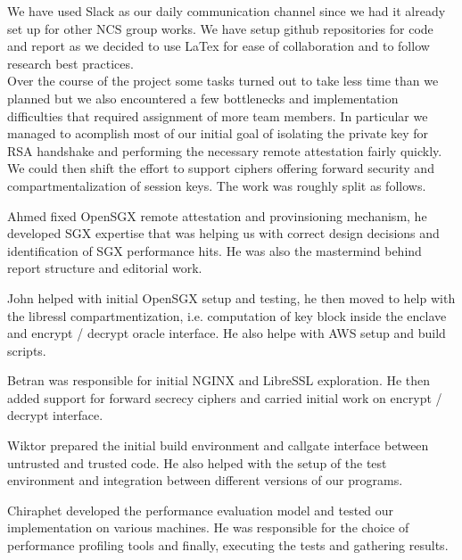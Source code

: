 \documentclass[../main.tex]{subfiles}
\begin{document}
We have used Slack as our daily communication channel since we had it already
set up for other NCS group works. We have setup github repositories for code
and report as we decided to use LaTex for ease of collaboration and to follow
research best practices.\\

Over the course of the project some tasks turned out to take less time than we
planned but we also encountered a few bottlenecks and implementation
difficulties that required assignment of more team members. In particular we
managed to acomplish most of our initial goal of isolating the private key for
RSA handshake and performing the necessary remote attestation fairly quickly.
We could then shift the effort to support ciphers offering forward security
and compartmentalization of session keys. The work was roughly split as
follows.

Ahmed fixed OpenSGX remote attestation and provinsioning mechanism, he
developed SGX expertise that was helping us with correct design decisions and
identification of SGX performance hits. He was also the mastermind behind
report structure and editorial work.

John helped with initial OpenSGX setup and testing, he then moved to help with
the libressl compartmentization, i.e. computation of key block inside the
enclave and encrypt / decrypt oracle interface. He also helpe with AWS setup
and build scripts.

Betran was responsible for initial NGINX and LibreSSL exploration. He then
added support for forward secrecy ciphers and carried initial work on
encrypt / decrypt interface.

Wiktor prepared the initial build environment and callgate interface between
untrusted and trusted code. He also helped with the setup of the test environment and integration between different versions of our programs.

Chiraphet developed the performance evaluation model and tested our implementation on various machines. He was responsible for the choice of performance profiling tools and finally, executing the tests and gathering results.
\end{document}

